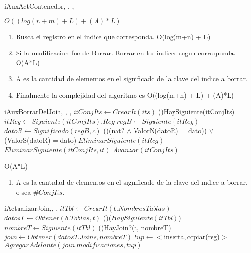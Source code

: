 \begin{Algoritmos}
\begin{algoritmo}{iAuxActContenedor}{, , , ,}{}
{    }
\end{algoritmo}
{}
{}
{$O((log(n+m) + L) + (A)*L) $}
{\begin{enumerate}
\item Busca el registro en el indice que corresponda. O(log(m+n) + L)
\item Si la modificacion fue de Borrar. Borrar en los indices segun corresponda. O(A*L)
\item A es la cantidad de elementos en el significado de la clave del indice a borrar.
\item Finalmente la complejidad del algoritmo es O((log(m+n) + L) + (A)*L)
\end{enumerate}}

\begin{algoritmo}{iAuxBorrarDelJoin}{, , , }{}
    $itConjIts \gets CrearIt(its) $ 
    \While(){HaySiguiente(itConjIts)}{
	    $ itReg \gets Siguiente(itConjIts).Reg $
    	$ regB \gets Siguiente(itReg) $ 
	    $ datoR \gets Significado(regB, c) $ 
		\If(){(nat? $\wedge$ ValorN(datoR) = dato)) $\vee$ (ValorS(datoR) = dato)}{
	        $EliminarSiguiente(itReg) $ 
            $EliminarSiguiente(itConjIts, it) $ 
        }
		$ Avanzar(itConjIts) $ 
    }
\end{algoritmo}
{}
{}
{O(A*L)}
{\begin{enumerate}
\item A es la cantidad de elementos en el significado de la clave del indice a borrar, o sea $\#ConjIts$.
\end{enumerate}}
\begin{algoritmo}{iActualizarJoin}{,, , }{}
    $itTbl \gets CrearIt(b.NombresTablas)$ 
    $datosT \gets Obtener(b.Tablas, t)$ 
    \While(){($HaySiguiente(itTbl)$)}{
    	$nombreT \gets Siguiente(itTbl)$ 
        \If(){HayJoin?(t, nombreT)}{
        	$join \gets Obtener(datosT.Joins, nombreT) $ 
            $tup \gets <$inserta$, $copiar(reg)$> $ 
	        $AgregarAdelante(join.modificaciones, tup) $ 
}}
\end{algoritmo}
\end{Algoritmos}
